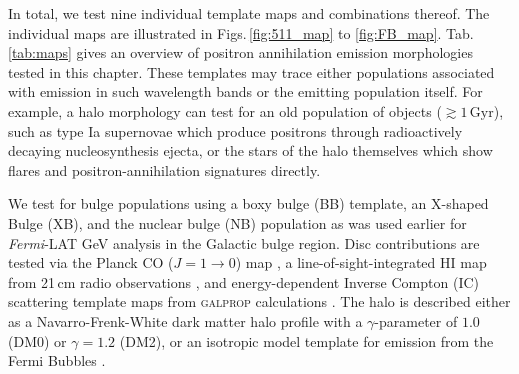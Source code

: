 \documentclass[doublespace,nopageskip]{VTthesis}
\newcommand{\mrm}[1]{\mathrm{#1}}
\begin{document}
%



In total, we test nine individual template maps and combinations thereof. 
%
The individual maps are illustrated in Figs.\,\ref{fig:511_map} to \ref{fig:FB_map}. Tab.\,\ref{tab:maps} gives an overview of positron annihilation emission morphologies tested in this chapter.
%
These templates may trace either populations associated with emission in such wavelength bands or the emitting population itself.
%
For example, a halo morphology can test for an old population of objects ($\gtrsim 1\,\mrm{Gyr}$), such as type Ia supernovae which produce positrons through radioactively decaying nucleosynthesis ejecta, or the stars of the halo themselves which show flares and positron-annihilation signatures directly.

We test for bulge populations using a boxy bulge ({BB}) template, an X-shaped Bulge ({XB}), and the nuclear bulge ({NB}) population as was used earlier \cite[e.g., ][]{2018NatAs...2..387M,2018NatAs...2..819B} for \textit{Fermi}-LAT GeV analysis in the Galactic bulge region.
%
Disc contributions are tested via the Planck {CO} ($J=1 \rightarrow 0$) map \citep{2016A&A...594A..10P}, a line-of-sight-integrated {HI} map from 21\,cm radio observations \citep{1990ARA&A..28..215D}, and energy-dependent Inverse Compton ({IC}) scattering template maps from \textsc{galprop} calculations \citep{2007ARNPS..57..285S}.
%
The halo is described either as a Navarro-Frenk-White \citep{1997ApJ...490..493N} dark matter halo profile with a $\gamma$-parameter of $1.0$ ({DM0}) or $\gamma=1.2$ ({DM2}), or an isotropic model template for emission from the Fermi Bubbles \citep[{FB}][]{2010ApJ...724.1044S}.
\end{document}
